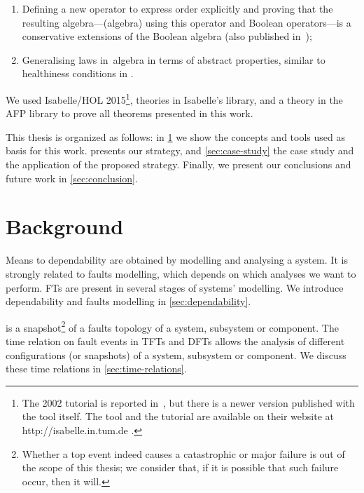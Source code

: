 \documentclass[en,twoside,onehalfspacing,phd]{risethesis}
\makeatletter
\newcommand{\todo}[1]{\@latex@warning{TODO #1}}
\makeatother
\begin{document}
\begin{enumerate}
  \item Defining a new operator to express order explicitly and proving that the resulting algebra---(\ac{algebra}) using this operator and Boolean operators---is a conservative extensions of the Boolean algebra (also published in~\cite{DM2016});
  \item Generalising laws in~\ac{algebra} in terms of abstract properties, similar to healthiness conditions in .
\end{enumerate}

We used Isabelle/HOL 2015\footnote{The 2002 tutorial is reported in~\cite{NPW2002}, but there is a newer version published with the tool itself.
The tool and the tutorial are available on their website at http://isabelle.in.tum.de .}, theories in Isabelle's library, and a theory in the AFP library \cite{JM2005} to prove all theorems presented in this work.

This thesis is organized as follows: in \cref{chap:background} we show the concepts and tools used as basis for this work.
 presents our strategy, and \cref{sec:case-study} the case study and the application of the proposed strategy.
Finally, we present our conclusions and future work in \cref{sec:conclusion}.

\chapter{Background}
\label{chap:background}

Means to dependability are obtained by modelling and analysing a system.
It is strongly related to faults modelling, which depends on which analyses we want to perform.
\Acp{FT} are present in several stages of systems' modelling.
We introduce dependability and faults modelling in \cref{sec:dependability}.

 is a snapshot\footnote{Whether a top event indeed causes a catastrophic or major failure is out of the scope of this thesis; we consider that, if it is possible that such failure occur, then it will.} of a faults topology of a system, subsystem or component.
The time relation on fault events in \acp{TFT} and \acp{DFT} allows the analysis of different configurations (or snapshots) of a system, subsystem or component.
We discuss these time relations in \cref{sec:time-relations}.
\end{document}
